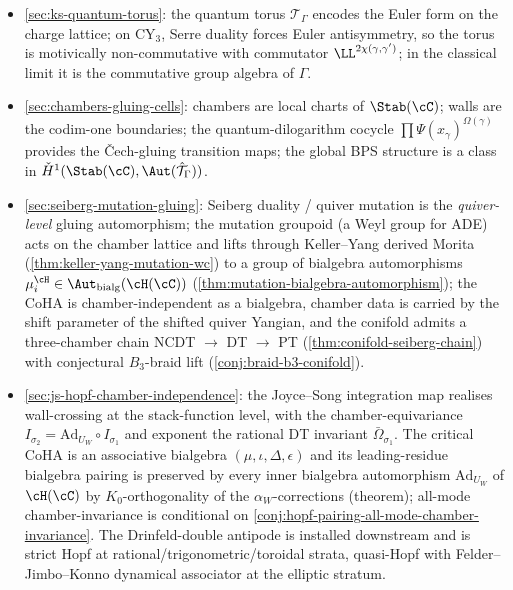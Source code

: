 \begin{itemize}[leftmargin=2em]
 \item \cref{sec:ks-quantum-torus}: the quantum torus $\mathcal{T}_\Gamma$ encodes the
 Euler form on the charge lattice; on CY$_3$, Serre duality forces
 Euler antisymmetry, so the torus is motivically non-commutative with
 commutator $\LL^{2\chi(\gamma, \gamma')}$; in the classical limit it
 is the commutative group algebra of $\Gamma$.
 \item \cref{sec:chambers-gluing-cells}: chambers are local charts of
 $\Stab(\cC)$; walls are the codim-one boundaries; the
 quantum-dilogarithm cocycle $\prod \Psi(\hat{x}_\gamma)^{\Omega(\gamma)}$
 provides the \v{C}ech-gluing transition maps; the global BPS
 structure is a class in $\check{H}^1(\Stab(\cC), \Aut(\hat{\mathcal{T}}_\Gamma))$.
 \item \cref{sec:seiberg-mutation-gluing}: Seiberg duality / quiver
 mutation is the \emph{quiver-level} gluing automorphism; the
 mutation groupoid (a Weyl group for ADE) acts on the chamber
 lattice and lifts through Keller--Yang derived Morita
 (\cref{thm:keller-yang-mutation-wc}) to a group of bialgebra
 automorphisms $\mu_i^\cH \in \Aut_{\mathrm{bialg}}(\cH(\cC))$
 (\cref{thm:mutation-bialgebra-automorphism}); the CoHA is
 chamber-independent as a bialgebra, chamber data is carried by
 the shift parameter of the shifted quiver Yangian, and the
 conifold admits a three-chamber chain
 NCDT $\to$ DT $\to$ PT (\cref{thm:conifold-seiberg-chain})
 with conjectural $B_3$-braid lift
 (\cref{conj:braid-b3-conifold}).
 \item \cref{sec:js-hopf-chamber-independence}: the Joyce--Song
 integration map realises wall-crossing at the stack-function level,
 with the chamber-equivariance $I_{\sigma_2} = \mathrm{Ad}_{U_W} \circ
 I_{\sigma_1}$ and exponent the rational DT invariant
 $\bar{\Omega}_{\sigma_1}$. The critical CoHA is an associative
 bialgebra $(\mu, \iota, \Delta, \epsilon)$ and its leading-residue
 bialgebra pairing is preserved by every inner bialgebra automorphism
 $\mathrm{Ad}_{U_W}$ of $\cH(\cC)$ by $K_0$-orthogonality of the
 $\alpha_W$-corrections (theorem); all-mode chamber-invariance is
 conditional on
 \cref{conj:hopf-pairing-all-mode-chamber-invariance}. The
 Drinfeld-double antipode is installed downstream and is strict Hopf
 at rational/trigonometric/toroidal strata, quasi-Hopf with
 Felder--Jimbo--Konno dynamical associator at the elliptic stratum.
\end{itemize}

